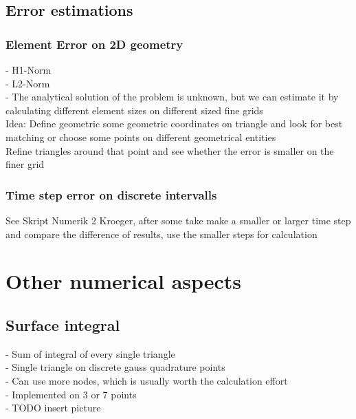 \documentclass[parskip=half, titlepage=yes, 12pt, BCOR=12mm, DIV=calc]{scrartcl}
\begin{document}
\subsection{Error estimations}

\subsubsection{Element Error on 2D geometry}
- H1-Norm \\
- L2-Norm \\

- The analytical solution of the problem is unknown, but we can estimate it by calculating different element sizes on different sized fine grids \\

Idea: Define geometric some geometric coordinates on triangle and look for best matching or choose some points on different geometrical entities \\

Refine triangles around that point and see whether the error is smaller on the finer grid \\

\subsubsection{Time step error on discrete intervalls}

See Skript Numerik 2 Kroeger, after some take make a smaller or larger time step and compare the difference of results, use the smaller steps for calculation \\


\newpage


\section{Other numerical aspects }


\subsection{Surface integral}
- Sum of integral of every single triangle \\
- Single triangle on discrete gauss quadrature points \\
- Can use more nodes, which is usually worth the calculation effort \\
- Implemented on 3 or 7 points \\
- TODO insert picture \\
\end{document}
